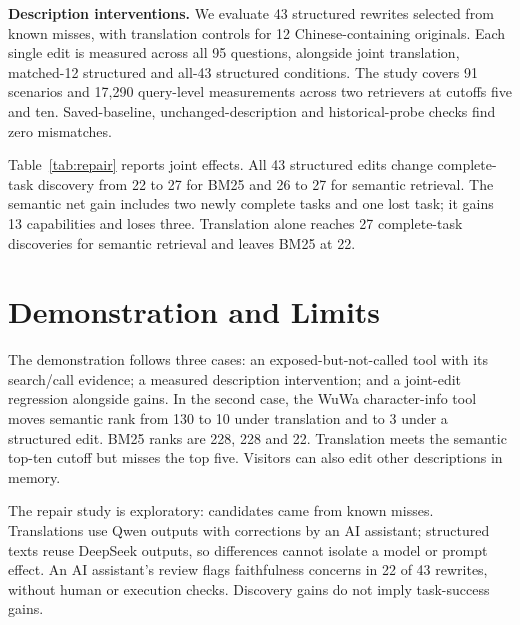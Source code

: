 \documentclass[runningheads,a4paper]{llncs}
\begin{document}
\begin{table}[t]
\setlength{\tabcolsep}{3pt}\small
\begin{minipage}[t]{0.5\textwidth}\centering
\caption{Saved retrieval results on 95 task questions. C: capability completeness. No corrected significance threshold is met.}
\label{tab:retrieval}
\resizebox{\linewidth}{!}{}
\end{minipage}\hfill
\begin{minipage}[t]{0.47\textwidth}\centering
\caption{Joint edit sets at cutoff ten. Cap: capabilities found (of 255); Tasks: complete-task discoveries (of 95), not agent task success.}
\label{tab:repair}
\resizebox{\linewidth}{!}{}
\end{minipage}
\end{table}

\textbf{Description interventions.} We evaluate 43 structured rewrites selected from known misses, with translation controls for 12 Chinese-containing originals. Each single edit is measured across all 95 questions, alongside joint translation, matched-12 structured and all-43 structured conditions. The study covers 91 scenarios and 17,290 query-level measurements across two retrievers at cutoffs five and ten. Saved-baseline, unchanged-description and historical-probe checks find zero mismatches.


Table~\ref{tab:repair} reports joint effects. All 43 structured edits change complete-task discovery from 22 to 27 for BM25 and 26 to 27 for semantic retrieval. The semantic net gain includes two newly complete tasks and one lost task; it gains 13 capabilities and loses three. Translation alone reaches 27 complete-task discoveries for semantic retrieval and leaves BM25 at 22.

\section{Demonstration and Limits}
The demonstration follows three cases: an exposed-but-not-called tool with its search/call evidence; a measured description intervention; and a joint-edit regression alongside gains. In the second case, the WuWa character-info tool moves semantic rank from 130 to 10 under translation and to 3 under a structured edit. BM25 ranks are 228, 228 and 22. Translation meets the semantic top-ten cutoff but misses the top five. Visitors can also edit other descriptions in memory.

The repair study is exploratory: candidates came from known misses. Translations use Qwen outputs with corrections by an AI assistant; structured texts reuse DeepSeek outputs, so differences cannot isolate a model or prompt effect. An AI assistant's review flags faithfulness concerns in 22 of 43 rewrites, without human or execution checks. Discovery gains do not imply task-success gains.
\end{document}
